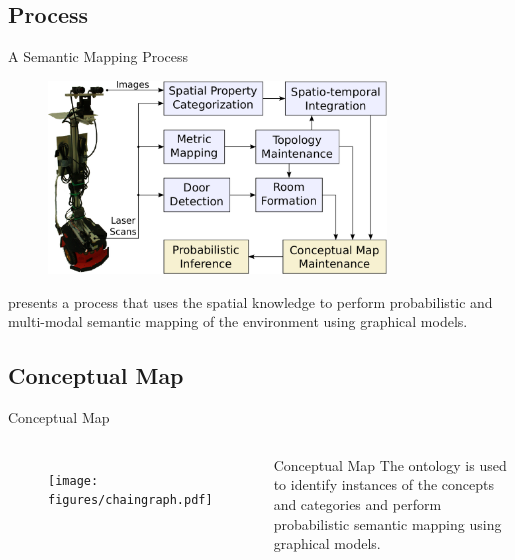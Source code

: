 \documentclass[compress]{beamer}
\begin{document}
\subsection{Process}
\begin{frame}{A Semantic Mapping Process}
  \begin{figure}
    \includegraphics[width=0.8\textwidth]{figures/dora-architecture.pdf}
  \end{figure}
  \cite{pronobis2011semmap} presents a process that uses the spatial knowledge
  to perform probabilistic and multi-modal semantic mapping of the environment
  using graphical models.
\end{frame}

\subsection{Conceptual Map}
\begin{frame}{Conceptual Map}
  \begin{columns}[c]
    \begin{figure}
      \texttt{[image: figures/chaingraph.pdf]}
    \end{figure}
    \begin{block}{Conceptual Map}
      The ontology is used to identify instances of the concepts and categories
      and perform probabilistic semantic mapping using graphical models.
    \end{block}
  \end{columns}

\end{frame}
\end{document}
